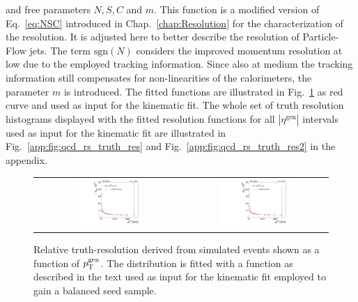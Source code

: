 and free parameters $N, S, C$ and $m$. This function is a modified version of Eq.~\ref{eq:NSC} introduced in Chap.~\ref{chap:Resolution} for the characterization of the resolution. It is adjusted here to better describe the resolution of Particle-Flow jets. The term $\mathrm{sgn}(N)$ considers the improved momentum resolution at low \pt due to the employed tracking information. Since also at medium \pt the tracking information still compensates for non-linearities of the calorimeters, the parameter $m$ is introduced. The fitted functions are illustrated in Fig.~\ref{fig:qcd_rs_truth_res} as red curve and used as input for the kinematic fit. The whole set of truth resolution histograms displayed with the fitted resolution functions for all $|\eta^\mathrm{gen}|$ intervals used as input for the kinematic fit are illustrated in Fig.~\ref{app:fig:qcd_rs_truth_res} and Fig.~\ref{app:fig:qcd_rs_truth_res2} in the appendix. 
\begin{figure}[!t]
  \centering
  \begin{tabular}{cc}
                \includegraphics[width=0.49\textwidth]{figures/TruthRes_Eta0.pdf} &
                \includegraphics[width=0.49\textwidth]{figures/TruthRes_Eta1.pdf} 
  \end{tabular}
  \caption{Relative truth-\pt resolution derived from simulated events shown as a function of $p_{\text{T}}^\mathrm{gen}$. The distribution is fitted with a function as described in the text used as input for the kinematic fit employed to gain a balanced seed sample.}
  \label{fig:qcd_rs_truth_res}
\end{figure}
\\
